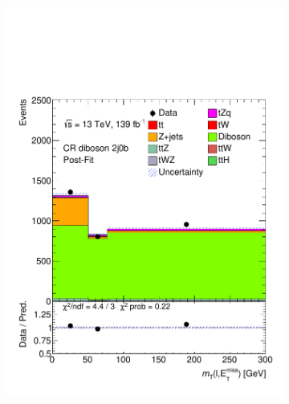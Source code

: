 \begin{figure}[!h]
\begin{subfigure}[b]{0.33\linewidth}
    \includegraphics[width=\textwidth]{ubonn-thesis/Chapters/Chapters_08/appendix/data/CR_2j0b_postFit.pdf} 
    \caption{}
  \end{subfigure} 
  \begin{subfigure}[b]{0.33\linewidth}
    \centering

\end{subfigure}
\end{figure}
